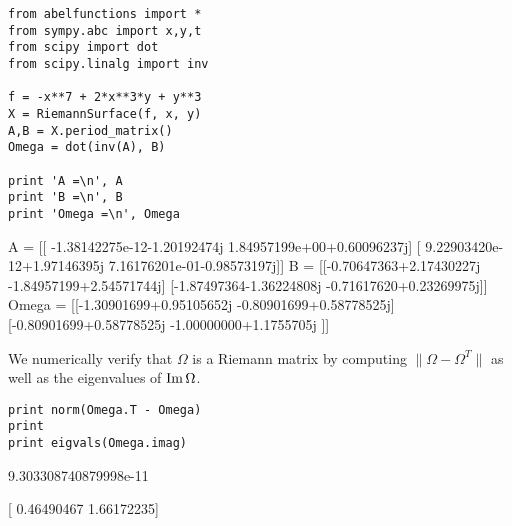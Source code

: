 \begin{lstlisting}
from abelfunctions import *
from sympy.abc import x,y,t
from scipy import dot
from scipy.linalg import inv

f = -x**7 + 2*x**3*y + y**3
X = RiemannSurface(f, x, y)
A,B = X.period_matrix()
Omega = dot(inv(A), B)

print 'A =\n', A
print 'B =\n', B
print 'Omega =\n', Omega
\end{lstlisting}
\begin{pyoutput}
A =
[[ -1.38142275e-12-1.20192474j   1.84957199e+00+0.60096237j]
 [  9.22903420e-12+1.97146395j   7.16176201e-01-0.98573197j]]
B =
[[-0.70647363+2.17430227j -1.84957199+2.54571744j]
 [-1.87497364-1.36224808j -0.71617620+0.23269975j]]
Omega =
[[-1.30901699+0.95105652j -0.80901699+0.58778525j]
 [-0.80901699+0.58778525j -1.00000000+1.1755705j ]]
\end{pyoutput}
We numerically verify that $\Omega$ is a Riemann matrix by computing
$\|\Omega - \Omega^T\|$ as well as the eigenvalues of $\operatorname{\text{Im}} \Omega$.
\begin{lstlisting}[firstnumber=14]
print norm(Omega.T - Omega)
print
print eigvals(Omega.imag)
\end{lstlisting}
\begin{pyoutput}
9.303308740879998e-11

[ 0.46490467  1.66172235]
\end{pyoutput}




